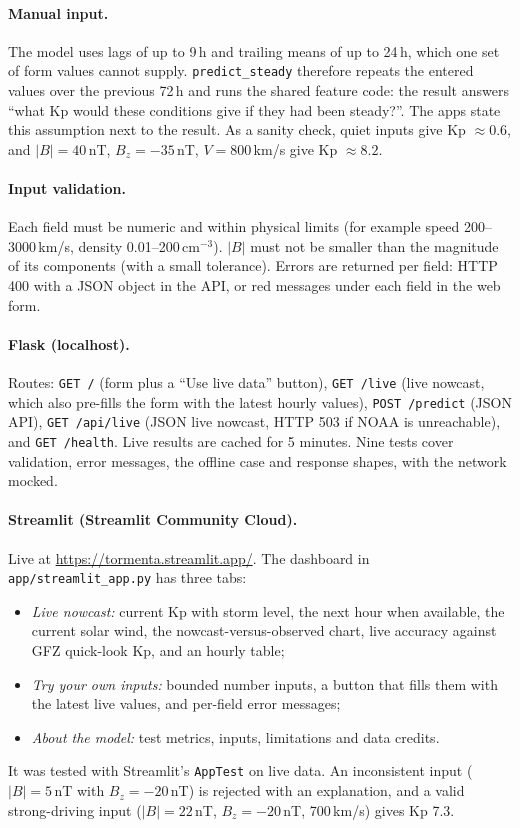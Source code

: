 \documentclass[11pt,a4paper]{article}
\newcommand{\code}[1]{\texttt{#1}}
\begin{document}
\paragraph{Manual input.} The model uses lags of up to 9\,h and trailing means of up to 24\,h, which one set of
form values cannot supply. \code{predict\_steady} therefore repeats the entered values over the previous 72\,h and
runs the shared feature code: the result answers ``what Kp would these conditions give if they had been
steady?''. The apps state this assumption next to the result. As a sanity check, quiet inputs give Kp $\approx 0.6$,
and $|B| = 40$\,nT, $B_z = -35$\,nT, $V = 800$\,km/s give Kp $\approx 8.2$.

\paragraph{Input validation.} Each field must be numeric and within physical limits (for example speed
200--3000\,km/s, density 0.01--200\,cm$^{-3}$). $|B|$ must not be smaller than the magnitude of its components
(with a small tolerance). Errors are returned per field: HTTP 400 with a JSON object in the API, or red
messages under each field in the web form.

\paragraph{Flask (localhost).} Routes: \code{GET /} (form plus a ``Use live data'' button), \code{GET /live}
(live nowcast, which also pre-fills the form with the latest hourly values), \code{POST /predict} (JSON API),
\code{GET /api/live} (JSON live nowcast, HTTP 503 if NOAA is unreachable), and \code{GET /health}. Live results
are cached for 5 minutes. Nine tests cover validation, error messages, the offline case and response shapes, with
the network mocked.

\paragraph{Streamlit (Streamlit Community Cloud).} Live at \url{https://tormenta.streamlit.app/}. The dashboard in \code{app/streamlit\_app.py} has three tabs:
\begin{itemize}
\item \emph{Live nowcast:} current Kp with storm level, the next hour when available, the current solar wind, the
nowcast-versus-observed chart, live accuracy against GFZ quick-look Kp, and an hourly table;
\item \emph{Try your own inputs:} bounded number inputs, a button that fills them with the latest live values, and
per-field error messages;
\item \emph{About the model:} test metrics, inputs, limitations and data credits.
\end{itemize}
It was tested with Streamlit's \code{AppTest} on live data. An inconsistent input ($|B| = 5$\,nT with
$B_z = -20$\,nT) is rejected with an explanation, and a valid strong-driving input ($|B| = 22$\,nT,
$B_z = -20$\,nT, 700\,km/s) gives Kp 7.3.
\end{document}
